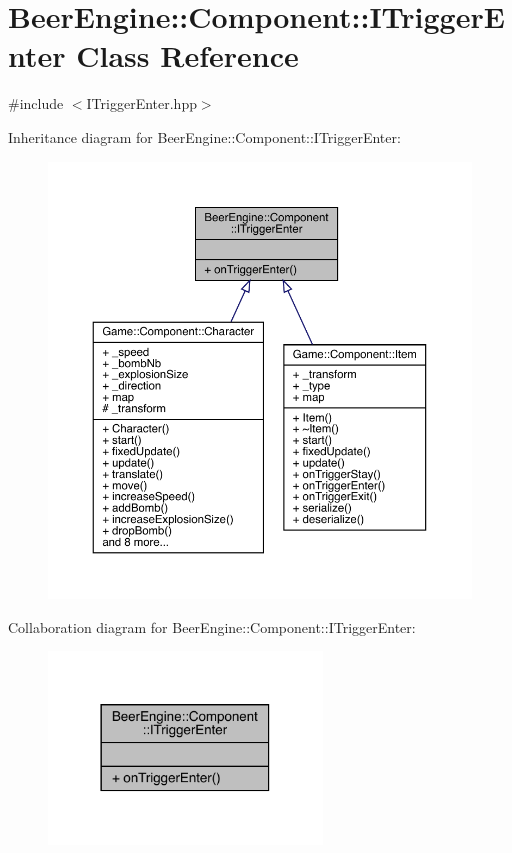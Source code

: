 \hypertarget{class_beer_engine_1_1_component_1_1_i_trigger_enter}{}\section{Beer\+Engine\+:\+:Component\+:\+:I\+Trigger\+Enter Class Reference}
\label{class_beer_engine_1_1_component_1_1_i_trigger_enter}


{\ttfamily \#include $<$I\+Trigger\+Enter.\+hpp$>$}



Inheritance diagram for Beer\+Engine\+:\+:Component\+:\+:I\+Trigger\+Enter\+:\nopagebreak
\begin{figure}[H]
\begin{center}
\leavevmode
\includegraphics[width=350pt]{class_beer_engine_1_1_component_1_1_i_trigger_enter__inherit__graph}
\end{center}
\end{figure}


Collaboration diagram for Beer\+Engine\+:\+:Component\+:\+:I\+Trigger\+Enter\+:\nopagebreak
\begin{figure}[H]
\begin{center}
\leavevmode
\includegraphics[width=206pt]{class_beer_engine_1_1_component_1_1_i_trigger_enter__coll__graph}
\end{center}
\end{figure}
